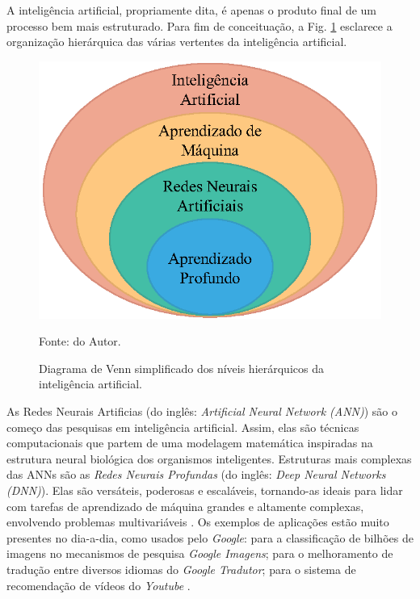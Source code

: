 A inteligência artificial, propriamente dita, é apenas o produto final de um processo bem mais estruturado. Para fim de conceituação, a Fig. \ref{fig: AI_Map} esclarece a organização hierárquica das várias vertentes da inteligência artificial.

\begin{figure}[H]
    \centering
    \includegraphics{04-Figuras/AI_Map.eps}
    \caption{Diagrama de Venn simplificado dos níveis hierárquicos da inteligência artificial.} \par
    Fonte: do Autor.
    \label{fig: AI_Map}
\end{figure}

As Redes Neurais Artificias (do inglês: \textit{Artificial Neural Network (ANN)}) são o começo das pesquisas em inteligência artificial. Assim, elas são técnicas computacionais que partem de uma modelagem matemática inspiradas na estrutura neural biológica dos organismos inteligentes. Estruturas mais complexas das ANNs são as \textit{Redes Neurais Profundas} (do inglês: \textit{Deep Neural Networks (DNN)}). Elas são versáteis, poderosas e escaláveis, tornando-as ideais para lidar com tarefas de aprendizado de máquina grandes e altamente complexas, envolvendo problemas multivariáveis \cite{lecun2015deep}. Os exemplos de aplicações estão muito presentes no dia-a-dia, como usados pelo \textit{Google}: para a classificação de bilhões de imagens no mecanismos de pesquisa \textit{Google Imagens}; para o melhoramento de tradução entre diversos idiomas do \textit{Google Tradutor}; para o sistema de recomendação de vídeos do \textit{Youtube} \cite{castelvecchi2016deep}.


